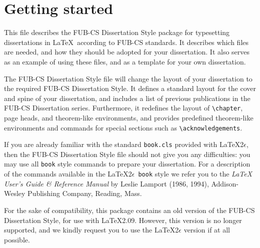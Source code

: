 \chapter{Getting started}

This file describes the FUB-CS Dissertation Style package for
typesetting dissertations in \LaTeX\ according to FUB-CS standards.
It describes which files are needed, and how they should be adopted
for your dissertation.
It also serves as an example of using these files, and as a template
for your own dissertation.

The FUB-CS Dissertation Style file will change the
layout of your dissertation to the required FUB-CS Dissertation Style.
It defines a standard layout for the cover and spine of your dissertation,
and includes a list of previous publications in the FUB-CS Dissertation series.
 Furthermore, it redefines the layout of \verb|\chapter|, page heads,
and theorem-like environments,
and provides predefined theorem-like environments and
commands for special sections such as \verb|\acknowledgements|.

If you are already familiar with the standard {\tt book.cls} provided with
\LaTeX 2$\epsilon$, then the FUB-CS Dissertation Style file should not give you
any difficulties: you may use all {\tt book} style commands to prepare 
your dissertation.
For a description of the commands available in the \LaTeX 2$\epsilon$\ 
{\tt book} style we refer you to the {\em \LaTeX{} User's Guide \& Reference
Manual\/} by Leslie Lamport (1986, 1994), Addison-Wesley Publishing
Company, Reading, Mass.

For the sake of compatibility, this package contains an old version of the
FUB-CS Dissertation Style, for use with \LaTeX 2.09. However, this version
is no longer supported, and we kindly request you to use the
\LaTeX 2$\epsilon$ version if at all possible.


